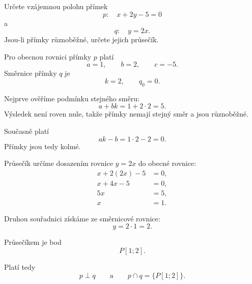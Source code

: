 \begin{example}\label{exa:Mixed_general_slope_perpendicular}
    Určete vzájemnou polohu přímek
    \[
        p:\quad x+2y-5=0
    \]
    a
    \[
        q:\quad y=2x.
    \]
    Jsou-li přímky různoběžné, určete jejich průsečík.

    Pro obecnou rovnici přímky $p$ platí
    \[
        a=1,
        \qquad
        b=2,
        \qquad
        c=-5.
    \]
    Směrnice přímky $q$ je
    \[
        k=2,
        \qquad
        q_0=0.
    \]

    Nejprve ověříme podmínku stejného směru:
    \[
        a+bk
        =
        1+2\cdot2
        =
        5.
    \]
    Výsledek není roven nule, takže přímky nemají stejný směr a jsou
    různoběžné.

    Současně platí
    \[
        ak-b
        =
        1\cdot2-2
        =
        0.
    \]
    Přímky jsou tedy kolmé.

    Průsečík určíme dosazením rovnice $y=2x$ do obecné rovnice:
    \begin{align*}
        x+2(2x)-5&=0,\\
        x+4x-5&=0,\\
        5x&=5,\\
        x&=1.
    \end{align*}

    Druhou souřadnici získáme ze směrnicové rovnice:
    \[
        y=2\cdot1=2.
    \]

    Průsečíkem je bod
    \[
        P[1;2].
    \]

    Platí tedy
    \[
        p\perp q
        \qquad\text{a}\qquad
        p\cap q=\{P[1;2]\}.
    \]
\end{example}


